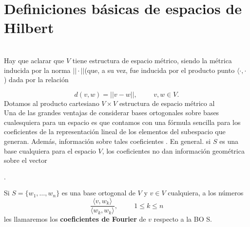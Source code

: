 \section{Definiciones básicas de espacios de Hilbert}


 \\



Hay que aclarar que $V$ tiene estructura
de espacio métrico, siendo la métrica inducida por
la norma $|| \cdot || $(que, a su vez, fue inducida
por el producto punto $\langle  \cdot , \cdot$ )
dada por la relación 

\[
d(v,w)= ||v-w||, \hspace{1cm} v, w \in V.
\]
Dotamos al producto cartesiano $V \times V $
estructura de espacio métrico al  \\


Una de las
grandes ventajas de considerar
bases ortogonales sobre bases cualesquiera para un espacio es que
contamos con una fórmula sencilla
para los coeficientes de la representación lineal de los
elementos del subespacio que generan. Además, información
sobre tales coeficientes .
En general. si $S$ es una base cualquiera para
el espacio $V$, los coeficientes no dan información
geométrica sobre el vector  \\
 

. 
 
 
 
 
\begin{defi}
Si $S=\{ w_{1}, \ldots , w_{n} \}$ es una base
ortogonal de $V$ y $v \in V$ cualquiera, a los
números
\[
\frac{\langle v , w_{k} \rangle}{\langle  w_{k}, w_{k} \rangle},
\hspace{1cm} 1 \leq k \leq n
\]
les llamaremos los \textbf{coeficientes de Fourier}
de $v$ respecto a la BO S.
\end{defi}

